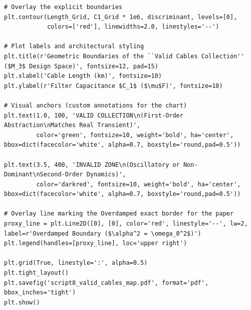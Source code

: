 \documentclass[energies,accept,oneauthor,pdftex]{Definitions/mdpi}
\begin{document}
{\begin{verbatim}
# Overlay the explicit boundaries
plt.contour(Length_Grid, C1_Grid * 1e6, discriminant, levels=[0],
            colors=['red'], linewidths=2.0, linestyles='--')

# Plot labels and architectural styling
plt.title(r'Geometric Boundaries of the ``Valid Cables Collection'' ($M_3$ Design Space)', fontsize=12, pad=15)
plt.xlabel('Cable Length (km)', fontsize=10)
plt.ylabel(r'Filter Capacitance $C_1$ ($\mu$F)', fontsize=10)

# Visual anchors (custom annotations for the chart)
plt.text(1.0, 100, 'VALID COLLECTION\n(First-Order Abstraction\nMatches Real Transient)',
         color='green', fontsize=10, weight='bold', ha='center', bbox=dict(facecolor='white', alpha=0.7, boxstyle='round,pad=0.5'))

plt.text(3.5, 400, 'INVALID ZONE\n(Oscillatory or Non-Dominant\nSecond-Order Dynamics)',
         color='darkred', fontsize=10, weight='bold', ha='center', bbox=dict(facecolor='white', alpha=0.7, boxstyle='round,pad=0.5'))

# Overlay line marking the Overdamped exact border for the paper
proxy_line = plt.Line2D([0], [0], color='red', linestyle='--', lw=2, label=r'Overdamped Boundary ($\alpha^2 = \omega_0^2$)')
plt.legend(handles=[proxy_line], loc='upper right')

plt.grid(True, linestyle=':', alpha=0.5)
plt.tight_layout()
plt.savefig('script8_valid_cables_map.pdf', format='pdf', bbox_inches='tight')
plt.show()
\end{verbatim}
}

\end{document}

